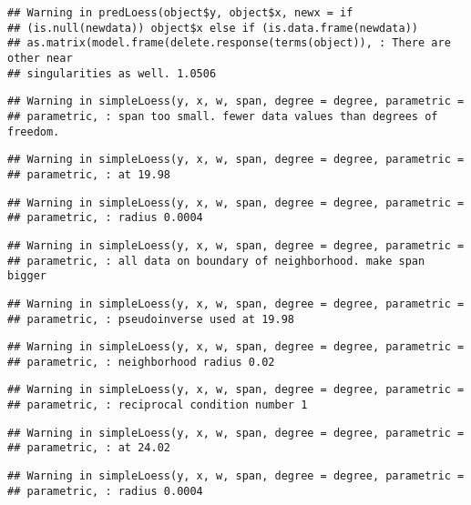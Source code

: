 \documentclass[
]{article}
\begin{document}
\begin{verbatim}
## Warning in predLoess(object$y, object$x, newx = if
## (is.null(newdata)) object$x else if (is.data.frame(newdata))
## as.matrix(model.frame(delete.response(terms(object)), : There are other near
## singularities as well. 1.0506
\end{verbatim}

\begin{verbatim}
## Warning in simpleLoess(y, x, w, span, degree = degree, parametric =
## parametric, : span too small. fewer data values than degrees of freedom.
\end{verbatim}

\begin{verbatim}
## Warning in simpleLoess(y, x, w, span, degree = degree, parametric =
## parametric, : at 19.98
\end{verbatim}

\begin{verbatim}
## Warning in simpleLoess(y, x, w, span, degree = degree, parametric =
## parametric, : radius 0.0004
\end{verbatim}

\begin{verbatim}
## Warning in simpleLoess(y, x, w, span, degree = degree, parametric =
## parametric, : all data on boundary of neighborhood. make span bigger
\end{verbatim}

\begin{verbatim}
## Warning in simpleLoess(y, x, w, span, degree = degree, parametric =
## parametric, : pseudoinverse used at 19.98
\end{verbatim}

\begin{verbatim}
## Warning in simpleLoess(y, x, w, span, degree = degree, parametric =
## parametric, : neighborhood radius 0.02
\end{verbatim}

\begin{verbatim}
## Warning in simpleLoess(y, x, w, span, degree = degree, parametric =
## parametric, : reciprocal condition number 1
\end{verbatim}

\begin{verbatim}
## Warning in simpleLoess(y, x, w, span, degree = degree, parametric =
## parametric, : at 24.02
\end{verbatim}

\begin{verbatim}
## Warning in simpleLoess(y, x, w, span, degree = degree, parametric =
## parametric, : radius 0.0004
\end{verbatim}
\end{document}
